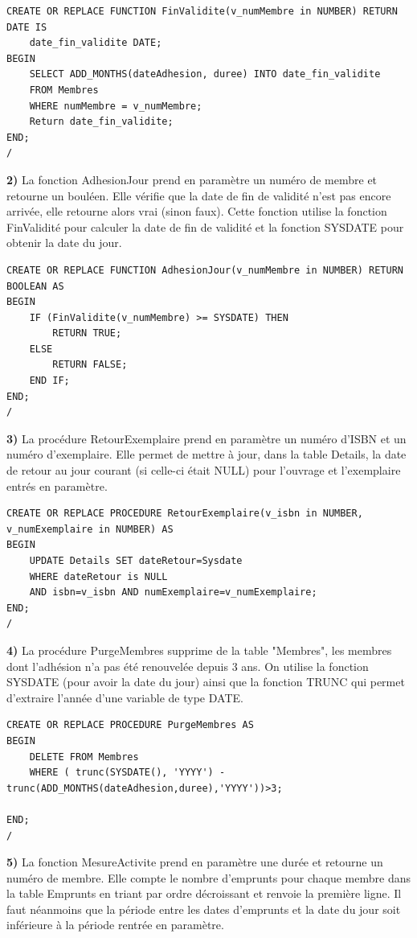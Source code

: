 \documentclass[a4paper,12pt]{article}
\begin{document}
           \begin{lstlisting}
CREATE OR REPLACE FUNCTION FinValidite(v_numMembre in NUMBER) RETURN DATE IS 	
	date_fin_validite DATE;
BEGIN  
	SELECT ADD_MONTHS(dateAdhesion, duree) INTO date_fin_validite
	FROM Membres
	WHERE numMembre = v_numMembre;
	Return date_fin_validite;  
END;
/
      \end{lstlisting}
          \clearpage
           \textbf {2)} La fonction AdhesionJour prend en paramètre un numéro de membre et retourne un bouléen. Elle vérifie que la date de fin de validité n'est pas encore arrivée, elle retourne alors vrai (sinon faux). Cette fonction utilise la fonction FinValidité pour calculer la date de fin de validité et la fonction SYSDATE pour obtenir la date du jour.
           
           \begin{lstlisting}
CREATE OR REPLACE FUNCTION AdhesionJour(v_numMembre in NUMBER) RETURN BOOLEAN AS  
BEGIN  
	IF (FinValidite(v_numMembre) >= SYSDATE) THEN
		RETURN TRUE;
	ELSE 
		RETURN FALSE;
	END IF;
END; 
/
      \end{lstlisting}
           
         \textbf {3)} La procédure RetourExemplaire prend en paramètre un numéro d'ISBN et un numéro d'exemplaire. Elle permet de mettre à jour, dans la table Details, la date de retour au jour courant (si celle-ci était NULL) pour l'ouvrage et l'exemplaire entrés en paramètre.
         
         \begin{lstlisting}
CREATE OR REPLACE PROCEDURE RetourExemplaire(v_isbn in NUMBER, v_numExemplaire in NUMBER) AS
BEGIN
	UPDATE Details SET dateRetour=Sysdate
	WHERE dateRetour is NULL
	AND isbn=v_isbn AND numExemplaire=v_numExemplaire;
END;
/     
      \end{lstlisting}
         
         \textbf {4)} La procédure PurgeMembres supprime de la table "Membres", les membres dont l'adhésion n'a pas été renouvelée depuis 3 ans. On utilise la fonction SYSDATE (pour avoir la date du jour) ainsi que la fonction TRUNC qui permet d'extraire l'année d'une variable de type DATE.
         
         \begin{lstlisting}
CREATE OR REPLACE PROCEDURE PurgeMembres AS
BEGIN
	DELETE FROM Membres
	WHERE ( trunc(SYSDATE(), 'YYYY') - trunc(ADD_MONTHS(dateAdhesion,duree),'YYYY'))>3;

END;
/          
      \end{lstlisting}
         \clearpage
         \textbf {5)} La fonction MesureActivite prend en paramètre une durée et retourne un numéro de membre. Elle compte le nombre d'emprunts pour chaque membre dans la table Emprunts en triant par ordre décroissant et renvoie la première ligne. Il faut néanmoins que la période entre les dates d'emprunts et la date du jour soit inférieure à la période rentrée en paramètre.
         
\end{document}
